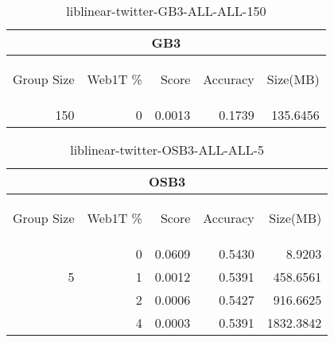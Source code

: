 \begin{center}
\begin{table}[htbp]
\begin{tabular}{ | r | r | r | r | r |}
\hline
\multicolumn{5}{|c|}{GB3}\\
\hline
\begin{sideways}Group Size\end{sideways} & \begin{sideways}Web1T \%\end{sideways} & \begin{sideways}Score\end{sideways} & \begin{sideways}Accuracy\end{sideways} & \begin{sideways}Size(MB)\end{sideways}\\
\hline
\multirow{0}{*}{150}
 & 0 & 0.0013 & 0.1739 & 135.6456\\ \cline{2-5}
\hline
\end{tabular}
\caption{liblinear-twitter-GB3-ALL-ALL-150}
\label{table:liblinear-twitter-GB3-ALL-ALL-150}
\end{table}
\end{center}

\begin{center}
\begin{table}[htbp]
\begin{tabular}{ | r | r | r | r | r |}
\hline
\multicolumn{5}{|c|}{OSB3}\\
\hline
\begin{sideways}Group Size\end{sideways} & \begin{sideways}Web1T \%\end{sideways} & \begin{sideways}Score\end{sideways} & \begin{sideways}Accuracy\end{sideways} & \begin{sideways}Size(MB)\end{sideways}\\
\hline
\multirow{3}{*}{5}
 & 0 & 0.0609 & 0.5430 & 8.9203\\ \cline{2-5}
 & 1 & 0.0012 & 0.5391 & 458.6561\\ \cline{2-5}
 & 2 & 0.0006 & 0.5427 & 916.6625\\ \cline{2-5}
 & 4 & 0.0003 & 0.5391 & 1832.3842\\ \cline{2-5}
\hline
\end{tabular}
\caption{liblinear-twitter-OSB3-ALL-ALL-5}
\label{table:liblinear-twitter-OSB3-ALL-ALL-5}
\end{table}
\end{center}


